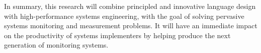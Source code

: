 


In summary, this research will combine principled and innovative
language design with high-performance systems engineering, with the
goal of solving pervasive systems monitoring and measurement problems.
It will have an immediate impact on the
productivity of systems implementers by helping produce the next
generation of monitoring systems.


